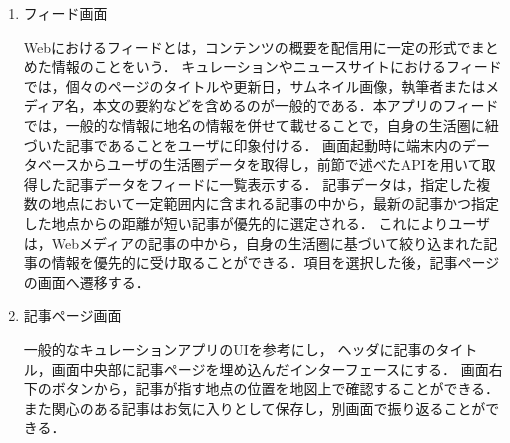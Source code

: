 \documentclass[a4paper]{jsarticle}
\begin{document}
\begin{enumerate}
\begin{enumerate}
\begin{enumerate}
  \item フィード画面

  Webにおけるフィードとは，コンテンツの概要を配信用に一定の形式でまとめた情報のことをいう．
  キュレーションやニュースサイトにおけるフィードでは，個々のページのタイトルや更新日，サムネイル画像，執筆者またはメディア名，本文の要約などを含めるのが一般的である．本アプリのフィードでは，一般的な情報に地名の情報を併せて載せることで，自身の生活圏に紐づいた記事であることをユーザに印象付ける．
  画面起動時に端末内のデータベースからユーザの生活圏データを取得し，前節で述べたAPIを用いて取得した記事データをフィードに一覧表示する．
  記事データは，指定した複数の地点において一定範囲内に含まれる記事の中から，最新の記事かつ指定した地点からの距離が短い記事が優先的に選定される．
  これによりユーザは，Webメディアの記事の中から，自身の生活圏に基づいて絞り込まれた記事の情報を優先的に受け取ることができる．項目を選択した後，記事ページの画面へ遷移する．

  \item 記事ページ画面

  一般的なキュレーションアプリのUIを参考にし，
  ヘッダに記事のタイトル，画面中央部に記事ページを埋め込んだインターフェースにする．
  画面右下のボタンから，記事が指す地点の位置を地図上で確認することができる．また関心のある記事はお気に入りとして保存し，別画面で振り返ることができる．


\end{enumerate}






\end{enumerate}
\end{enumerate}
\end{document}
